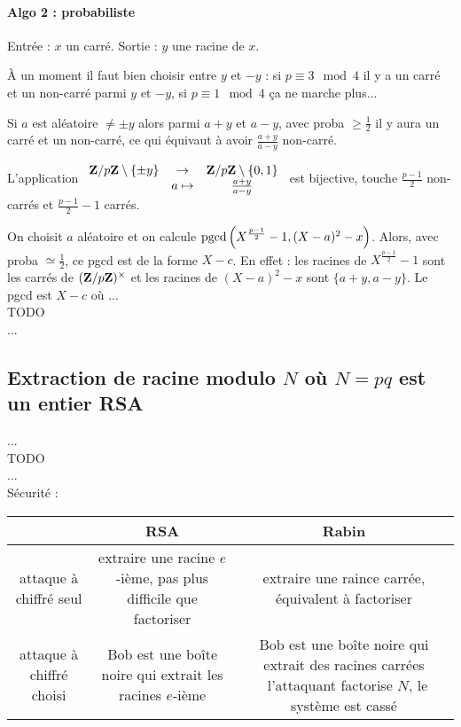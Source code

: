 \paragraph{Algo 2 : probabiliste}

	Entrée : $x$ un carré. Sortie : $y$ une racine de $x$.
	
	À un moment il faut bien choisir entre $y$ et $-y$ : si $p \equiv 3 \mod 4$ il y a un carré et un non-carré parmi $y$ et $-y$, si $p \equiv 1 \mod 4$  ça ne marche plus...
	
	\begin{rem}
		Si $a$ est aléatoire $\neq \pm y$ alors parmi $a + y$ et $a - y$, avec proba $\geq \frac{1}{2}$ il y aura un carré et un non-carré, ce qui équivaut à avoir $\frac{a + y}{a - y}$ non-carré.
		
		L'application $\begin{array}{ccc} \mathbf{Z}/p\mathbf{Z} \setminus \{ \pm y \} & \to & \mathbf{Z}/p\mathbf{Z} \setminus \{ 0,1 \} \\ & a \mapsto & \frac{a + y}{a - y} \end{array}$ est bijective, touche $\frac{p - 1}{2}$ non-carrés et $\frac{p - 1}{2} - 1$ carrés.
	\end{rem}
	
	On choisit $a$ aléatoire et on calcule $\operatorname{pgcd} \left( X^{\frac{p-1}{2}} - 1, (X - a)^2 - x \right)$.
	Alors, avec proba $\simeq \frac{1}{2}$, ce pgcd est de la forme $X - c$.
	En effet : les racines de $X^{\frac{p-1}{2}} - 1$ sont les carrés de $(\mathbf{Z} / p\mathbf{Z})^\times$ et les racines de $(X - a)^2 - x$ sont $\{ a + y, a - y \}$.
	Le pgcd est $X - c$ où ...\\
	TODO \\
	... \\


\subsection{Extraction de racine modulo $N$ où $N = pq$ est un entier RSA}
	
	...\\
	TODO\\
	...\\
	
	Sécurité :\\
	\begin{tabular}{ccc}
	& RSA & Rabin \\
	\hline
	attaque à chiffré seul & extraire une racine $e$-ième, pas plus difficile que factoriser & extraire une raince carrée, équivalent à factoriser \\
	attaque à chiffré choisi & Bob est une boîte noire qui extrait les racines $e$-ième & Bob est une boîte noire qui extrait des racines carrées \textrightarrow\ l'attaquant factorise $N$, le système est cassé
	\end{tabular}


